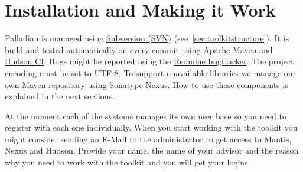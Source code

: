 \documentclass[a4paper,twoside]{book}      %
\begin{document}
\chapter{Installation and Making it Work}
Palladian is managed using \href{http://subversion.apache.org/}{Subversion (SVN)} (see~\ref{sec:toolkitstructure}). It is build and tested automatically on every commit using \href{http://maven.apache.org/}{Apache Maven} and \href{http://hudson-ci.org/}{Hudson CI}. Bugs might be reported using the \href{http://www.redmine.org/}{Redmine bugtracker}. The project encoding must be set to UTF-8. To support unavailable libraries we manage our own Maven repository using \href{http://nexus.sonatype.org/}{Sonatype Nexus}. How to use these components is explained in the next sections.

At the moment each of the systems manages its own user base so you need to register with each one individually. When you start working with the toolkit you might consider sending an E-Mail to the administrator to get access to Mantis, Nexus and Hudson. Provide your name, the name of your advisor and the reason why you need to work with the toolkit and you will get your logins.
\end{document}
